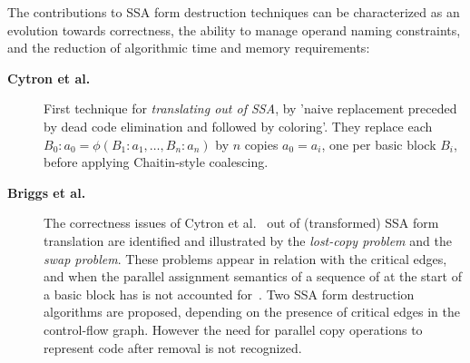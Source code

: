 The contributions to SSA form destruction techniques can be characterized as an
evolution towards correctness, the ability to manage operand naming constraints,
and the reduction of algorithmic time and memory requirements:
\begin{description}

\item[\textbf{Cytron et al.~\cite{Cytron:1991:TOPLAS}}] First technique for
\emph{translating out of SSA}, by 'naive replacement preceded by dead code
elimination and followed by coloring'. They replace each \phifun
$B_0:a_0=\phi(B_1:a_1,\dots,B_n:a_n)$ by $n$ copies $a_0 = a_i$, one per basic
block $B_i$, before applying Chaitin-style coalescing.

\item[\textbf{Briggs et al.~\cite{Briggs:1998:SPE}}] The correctness issues of
Cytron et al.~\cite{Cytron:1991:TOPLAS} out of (transformed) SSA form
translation are identified and illustrated by the \emph{lost-copy problem} and the
\emph{swap problem}. These problems appear in relation with the critical edges,
and when the parallel assignment semantics of a sequence of \phifuns at the
start of a basic block has is not accounted for~\cite{Boissinot:2009:CGO}. Two SSA form
destruction algorithms are proposed, depending on the presence of critical edges
in the control-flow graph. However the need for parallel copy operations to
represent code after \phifun removal is not recognized.


\end{description}
